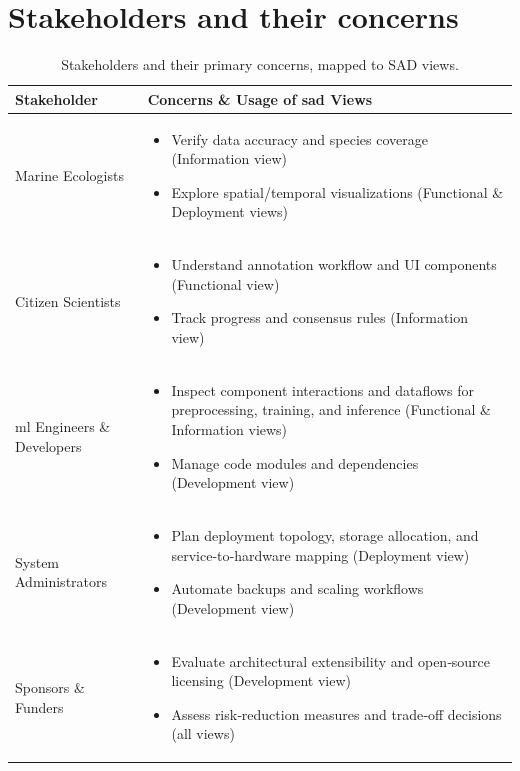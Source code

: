 \section{Stakeholders and their concerns}
\begin{table}[ht]
    \small
    \centering
    \begin{tabular}{p{} p{}}
      \toprule
      \textbf{Stakeholder} & \textbf{Concerns \& Usage of \gls{sad} Views} \\
      \midrule
      Marine Ecologists &
        \begin{itemize}[nosep,leftmargin=*]
          \item Verify data accuracy and species coverage (Information view)
          \item Explore spatial/temporal visualizations (Functional \& Deployment views)
        \end{itemize} \\
      \addlinespace
      Citizen Scientists &
        \begin{itemize}[nosep,leftmargin=*]
          \item Understand annotation workflow and UI components (Functional view)
          \item Track progress and consensus rules (Information view)
        \end{itemize} \\
      \addlinespace
      \gls{ml} Engineers \& Developers &
        \begin{itemize}[nosep,leftmargin=*]
          \item Inspect component interactions and dataflows for preprocessing, training, and inference (Functional \& Information views)
          \item Manage code modules and dependencies (Development view)
        \end{itemize} \\
      \addlinespace
      System Administrators &
        \begin{itemize}[nosep,leftmargin=*]
          \item Plan deployment topology, storage allocation, and service‐to‐hardware mapping (Deployment view)
          \item Automate backups and scaling workflows (Development view)
        \end{itemize} \\
      \addlinespace
      Sponsors \& Funders &
        \begin{itemize}[nosep,leftmargin=*]
          \item Evaluate architectural extensibility and open‐source licensing (Development view)
          \item Assess risk‐reduction measures and trade‐off decisions (all views)
        \end{itemize} \\
      \bottomrule
    \end{tabular}
    \caption{Stakeholders and their primary concerns, mapped to SAD views.}
    \label{tab:stakeholders-concerns}
  \end{table}




